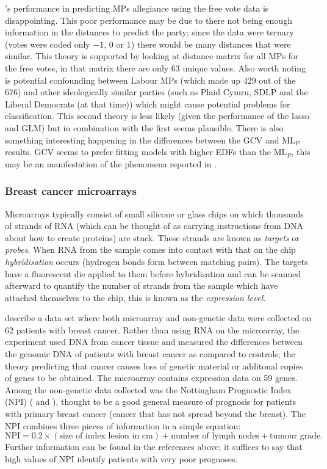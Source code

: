\mdsds's performance in predicting MPs allegiance using the free vote data is disappointing. This poor performance may be due to there not being enough information in the distances to predict the party; since the data were ternary (votes were coded only $-1$, $0$ or $1$) there would be many distances that were similar. This theory is supported by looking at distance matrix for all MPs for the free votes, in that matrix there are only 63 unique values. Also worth noting is potential confounding between Labour MPs (which made up 429 out of the 676) and other ideologically similar parties (such as Plaid Cymru, SDLP and the Liberal Democrats (at that time)) which might cause potential problems for classification. This second theory is less likely (given the performance of the lasso and GLM) but in combination with the first seems plausible. There is also something interesting happening in the differences between the GCV and $\text{ML}_P$ results.  GCV seems to prefer fitting models with higher EDFs than the $\text{ML}_P$, this may be an manifestation of the phenomena reported in .

\subsubsection{Breast cancer microarrays}

Microarrays typically consist of small silicone or glass chips on which thousands of strands of RNA (which can be thought of as carrying instructions from DNA about how to create proteins) are stuck. These strands are known as \textit{targets} or \textit{probes}. When RNA from the sample comes into contact with that on the chip \textit{hybridisation} occurs (hydrogen bonds form between matching pairs). The targets have a fluorescent die applied to them before hybridisation and can be scanned afterward to quantify the number of strands from the sample which have attached themselves to the chip, this is known as the \textit{expression level}.

 describe a data set where both microarray and non-genetic data were collected on 62 patients with breast cancer. Rather than using RNA on the microarray, the experiment used DNA from cancer tissue and measured the differences between the genomic DNA of patients with breast cancer as compared to controls; the theory predicting that cancer causes loss of genetic material or additonal copies of genes to be obtained. The microarray contains expression data on 59 genes. Among the non-genetic data collected was the Nottingham Prognostic Index (NPI) (\cite{Haybittle1982} and \cite{Todd1987}), thought to be a good general measure of prognosis for patients with primary breast cancer (cancer that has not spread beyond the breast). The NPI combines three pieces of information in a simple equation:
\begin{equation*}
\text{NPI} = 0.2 \times (\text{size of index lesion in cm}) + \text{number of lymph nodes} + \text{tumour grade}.
\end{equation*}
Further information can be found in the references above; it suffices to say that high values of NPI identify patients with very poor prognoses.

